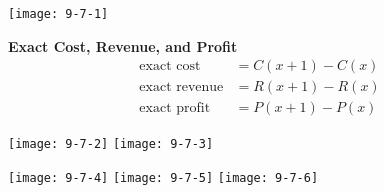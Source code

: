 \documentclass[14pt]{extarticle}
\begin{document}
\cleardoublepage

\begin{center}
	\texttt{[image: 9-7-1]}
\end{center}

\begin{tcolorbox}[enhanced jigsaw,colback=bg,boxrule=0pt,arc=0pt]
	\textbf{Exact Cost, Revenue, and Profit}
	\begin{align*}
		\text{exact cost} &= C(x+1)-C(x) \\
		\text{exact revenue} &= R(x+1) - R(x) \\
		\text{exact profit} &= P(x+1) - P(x)
	\end{align*}
\end{tcolorbox}
\begin{center}
	\texttt{[image: 9-7-2]}
	\texttt{[image: 9-7-3]}
\end{center}

\cleardoublepage

\begin{center}
	\texttt{[image: 9-7-4]}
	\texttt{[image: 9-7-5]}
	\texttt{[image: 9-7-6]}
\end{center}
\end{document}
